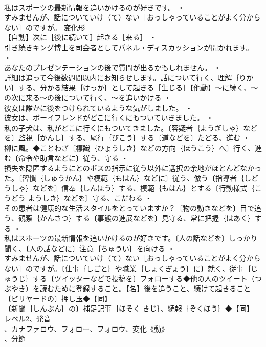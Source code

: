 \documentclass[8pt]{extreport}
\begin{document}
\begin{CJK}{UTF8}{min}
\\	私はスポーツの最新情報を追いかけるのが好きです。 ・
\\	すみませんが、話についていけ（て）ない［おっしゃっていることがよく分からない］のですが。	変化形 
\\	【自動】次に［後に続いて］起きる［来る］ ・
\\	引き続きキング博士を司会者としてパネル・ディスカッションが開かれます。 ・
\\	あなたのプレゼンテーションの後で質問が出るかもしれません。 ・
\\	詳細は追って今後数週間以内にお知らせします。話について行く、理解｛りかい｝する、分かる結果｛けっか｝として起きる［生じる］【他動】～に続く、～の次に来る～の後について行く、～を追いかける ・
\\	彼女は誰かに後をつけられているような気がしました。 ・
\\	彼女は、ボーイフレンドがどこに行くにもついていきました。 ・
\\	私の子犬は、私がどこに行くにもついてきました。〔容疑者｛ようぎしゃ｝などを〕監視｛かんし｝する、尾行｛びこう｝する〔道などを〕たどる、進む ・
\\	柳に風。◆ことわざ〔標識｛ひょうしき｝などの方向｛ほうこう｝へ〕行く、進む〔命令や助言などに〕従う、守る ・
\\	損失を隠匿するようにとのボスの指示に従う以外に選択の余地がほとんどなかった。〔習慣｛しゅうかん｝や模範｛もはん｝などに〕従う、倣う〔指導者｛しどうしゃ｝などを〕信奉｛しんぽう｝する、模範｛もはん｝とする〔行動様式｛こうどう ようしき｝などを〕守る、こだわる ・
\\	その患者は健康的な生活スタイルをとっていますか？〔物の動きなどを〕目で追う、観察｛かんさつ｝する〔事態の進展などを〕見守る、常に把握｛はあく｝する ・
\\	私はスポーツの最新情報を追いかけるのが好きです。〔人の話などを〕しっかり聞く、〔人の話などに〕注意｛ちゅうい｝を向ける ・
\\	すみませんが、話についていけ（て）ない［おっしゃっていることがよく分からない］のですが。〔仕事｛しごと｝や職業｛しょくぎょう｝に〕就く、従事｛じゅうじ｝する〔ツイッターなどで投稿を〕フォローする◆他の人のツイート（つぶやき）を読むために登録すること。【名】後を追うこと、続けて起きること〔ビリヤードの〕押し玉◆【同】
\\	〔新聞｛しんぶん｝の〕補足記事｛ほそく きじ｝、続報｛ぞくほう｝◆【同】
\\	レベル2、発音
\\	、カナファロウ、フォロー、フォロウ、変化《動》
\\	、分節

\end{CJK}
\end{document}
